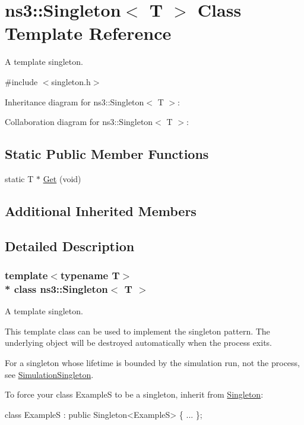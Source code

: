 \hypertarget{classns3_1_1Singleton}{}\section{ns3\+:\+:Singleton$<$ T $>$ Class Template Reference}
\label{classns3_1_1Singleton}


A template singleton.  




{\ttfamily \#include $<$singleton.\+h$>$}



Inheritance diagram for ns3\+:\+:Singleton$<$ T $>$\+:


Collaboration diagram for ns3\+:\+:Singleton$<$ T $>$\+:
\subsection*{Static Public Member Functions}
\begin{DoxyCompactItemize}
\item 
static T $\ast$ \hyperlink{classns3_1_1Singleton_a80a2cd3c25a27ea72add7a9f7a141ffa}{Get} (void)
\end{DoxyCompactItemize}
\subsection*{Additional Inherited Members}


\subsection{Detailed Description}
\subsubsection*{template$<$typename T$>$\\*
class ns3\+::\+Singleton$<$ T $>$}

A template singleton. 

This template class can be used to implement the singleton pattern. The underlying object will be destroyed automatically when the process exits.

For a singleton whose lifetime is bounded by the simulation run, not the process, see \hyperlink{classns3_1_1SimulationSingleton}{Simulation\+Singleton}.

To force your {\ttfamily class ExampleS} to be a singleton, inherit from \hyperlink{classns3_1_1Singleton}{Singleton}\+: 
\begin{DoxyCode}
\textcolor{keyword}{class }ExampleS : \textcolor{keyword}{public} Singleton<ExampleS> \{ ... \};
\end{DoxyCode}


